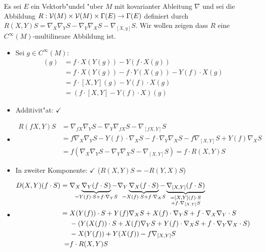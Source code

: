 \begin{Loes}
Es sei $E$ ein Vektorb"undel "uber $M$ mit kovarianter Ableitung $\nabla$ und sei die Abbildung $R: \operatorname{\mathcal{V}}(M) \times \operatorname{\mathcal{V}}(M) \times \Gamma(E) \to \Gamma(E)$ definiert durch $R(X, Y)S = \nabla_X\nabla_YS - \nabla_Y\nabla_XS - \nabla_{[X,y]}S$. Wir wollen zeigen dass $R$ eine $C^\infty(M)$-multilineare Abbildung ist.
\begin{itemize}[leftmargin=*]
\item
	Sei $g \in C^\infty(M)$:
	\begin{align*}
		[fX,Y](g) &= f \cdot X(Y(g)) - Y(f \cdot X(g))\\
		&= f \cdot X(Y(g)) - f \cdot Y(X(g)) - Y(f) \cdot X(g)\\
		&= f \cdot [X,Y](g) - Y(f) \cdot X(g)\\
		&= (f \cdot [X,Y] - Y(f) \cdot X)(g)
	\end{align*}
\item
	Additivit"at: $\checkmark$
\item
	\begin{align*}
		R(fX,Y)S &= \nabla_{fX}\nabla_YS - \nabla_Y\nabla_{fX}S - \nabla_{[fX,Y]}S\\
		&= f\nabla_X\nabla_YS - Y(f) \cdot \nabla_XS - f \cdot \nabla_Y\nabla_XS - f\nabla_{[X,Y]}S + Y(f)\nabla_XS\\
		&= f(\nabla_X\nabla_YS - \nabla_Y\nabla_XS - \nabla_{[X,Y]}S) = f \cdot R(X,Y) S
	\end{align*}
\item
	In zweiter Komponente: $\checkmark$ ($R(X,Y)S = -R(Y,X)S$)
\item
	\begin{align*}
		D(X,Y)(f \cdot S) = {} & \nabla_X\underbrace{\nabla_Y(f \cdot S)}_{\mathclap{=Y(f)\cdot S + f \cdot \nabla_YS}} - \nabla_Y\underbrace{\nabla_X(f\cdot S)}_{\mathclap{=X(f) \cdot S + f \cdot \nabla_XS}} - \underbrace{\nabla_{[X,Y]}(f\cdot S)}_{\mathclap{\substack{=[X,Y](f) \cdot S\\ + f \cdot \nabla_{[X,Y]}S}}}\\
		= {} & X(Y(f)) \cdot S + Y(f)\nabla_XS + X(f) \cdot \nabla_YS + f \cdot \nabla_X\nabla_Y \cdot S\\
		 & -(Y(X(f)) \cdot S + X(f)\nabla_YS + Y(f)\cdot\nabla_XS + f\cdot\nabla_Y\nabla_X\cdot S)\\
		 & -X(Y(f)) + Y(X(f)) - f\nabla_{[X,Y]}S \\ =& f \cdot R(X,Y)S
	\end{align*}
\end{itemize}\end{Loes}

